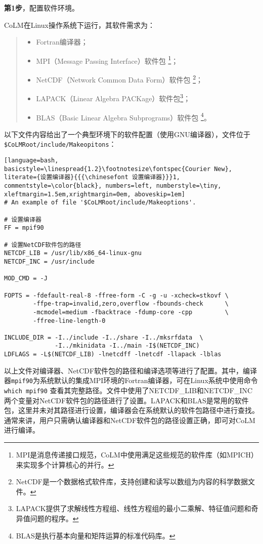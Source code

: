 \textbf{第1步}，配置软件环境。

CoLM在Linux操作系统下运行，其软件需求为：
\begin{quote}
\begin{itemize}
\setlength{\itemsep}{0pt}
\setlength{\parsep}{0pt}
\setlength{\parskip}{0pt}
    \item Fortran编译器；
    \item MPI（Message Passing Interface）软件包 \footnote{MPI是消息传递接口规范，CoLM中使用满足这些规范的软件库（如MPICH）来实现多个计算核心的并行。}；
    \item NetCDF（Network Common Data Form）软件包 \footnote{NetCDF是一个数据格式软件库，支持创建和读写以数组为内容的科学数据文件。}；
    \item LAPACK（Linear Algebra PACKage）软件包\footnote{LAPACK提供了求解线性方程组、线性方程组的最小二乘解、特征值问题和奇异值问题的程序。}；
    \item BLAS（Basic Linear Algebra Subprograms）软件包 \footnote{BLAS是执行基本向量和矩阵运算的标准代码库。}。
\end{itemize}
\end{quote}

以下文件内容给出了一个典型环境下的软件配置（使用GNU编译器），文件位于\texttt{\$CoLMRoot/include/\allowbreak Makeopitons}：
\begin{lstlisting}[language=bash, basicstyle=\linespread{1.2}\footnotesize\fontspec{Courier New},
literate={设置编译器}{{{\chinesefont 设置编译器}}}1, commentstyle=\color{black}, numbers=left, numberstyle=\tiny, xleftmargin=1.5em,xrightmargin=0em, aboveskip=1em]
# An example of file '$CoLMRoot/include/Makeoptions'.

# 设置编译器
FF = mpif90

# 设置NetCDF软件包的路径
NETCDF_LIB = /usr/lib/x86_64-linux-gnu
NETCDF_INC = /usr/include

MOD_CMD = -J

FOPTS = -fdefault-real-8 -ffree-form -C -g -u -xcheck=stkovf \
        -ffpe-trap=invalid,zero,overflow -fbounds-check      \
        -mcmodel=medium -fbacktrace -fdump-core -cpp         \
        -ffree-line-length-0

INCLUDE_DIR = -I../include -I../share -I../mksrfdata  \ 
              -I../mkinidata -I../main -I$(NETCDF_INC)
LDFLAGS = -L$(NETCDF_LIB) -lnetcdff -lnetcdf -llapack -lblas

\end{lstlisting}

以上文件对编译器、NetCDF软件包的路径和编译选项等进行了配置。其中，编译器\texttt{mpif90}为系统默认的集成MPI环境的Fortran编译器，可在Linux系统中使用命令 \texttt{which mpif90} 查看其完整路径。文件中使用了NETCDF\_LIB和NETCDF\_INC两个变量对NetCDF软件包的路径进行了设置。LAPACK和BLAS是常用的软件包，这里并未对其路径进行设置，编译器会在系统默认的软件包路径中进行查找。通常来讲，用户只需确认编译器和NetCDF软件包的路径设置正确，即可对CoLM进行编译。

